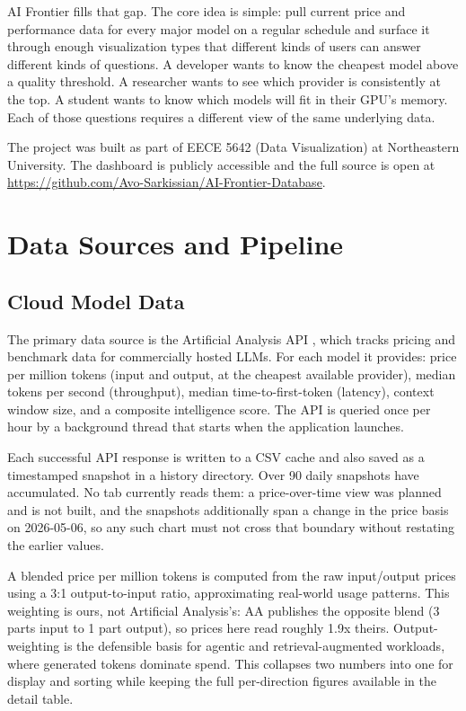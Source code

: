\documentclass{article}
\begin{document}
AI Frontier fills that gap. The core idea is simple: pull current price and
performance data for every major model on a regular schedule and surface it
through enough visualization types that different kinds of users can answer
different kinds of questions. A developer wants to know the cheapest model
above a quality threshold. A researcher wants to see which provider is
consistently at the top. A student wants to know which models will fit in
their GPU's memory. Each of those questions requires a different view of the
same underlying data.

The project was built as part of EECE 5642 (Data Visualization) at
Northeastern University. The dashboard is publicly accessible and the full
source is open at
\url{https://github.com/Avo-Sarkissian/AI-Frontier-Database}.

\section{Data Sources and Pipeline}

\subsection{Cloud Model Data}

The primary data source is the Artificial Analysis API
\cite{artificialanalysis}, which tracks pricing and benchmark data for
commercially hosted LLMs. For each model it provides: price per million
tokens (input and output, at the cheapest available provider), median tokens
per second (throughput), median time-to-first-token (latency), context window
size, and a composite intelligence score. The API is queried once per hour by
a background thread that starts when the application launches.

Each successful API response is written to a CSV cache and also saved as a
timestamped snapshot in a history directory. Over 90 daily snapshots have
accumulated. No tab currently reads them: a price-over-time view was planned
and is not built, and the snapshots additionally span a change in the price
basis on 2026-05-06, so any such chart must not cross that boundary without
restating the earlier values.

A blended price per million tokens is computed from the raw input/output
prices using a 3:1 output-to-input ratio, approximating real-world usage
patterns. This weighting is ours, not Artificial Analysis's: AA publishes the
opposite blend (3 parts input to 1 part output), so prices here read roughly
1.9x theirs. Output-weighting is the defensible basis for agentic and
retrieval-augmented workloads, where generated tokens dominate spend. This collapses two numbers into one for display and sorting while
keeping the full per-direction figures available in the detail table.
\end{document}
